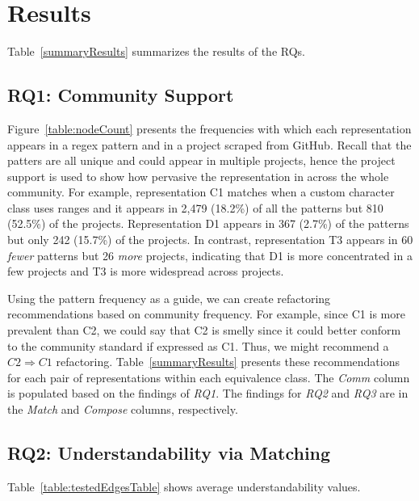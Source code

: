 \section{Results}
\label{sec:results}
Table~\ref{summaryResults} summarizes the results of the RQs.  



\subsection{RQ1: Community Support}
Figure~\ref{table:nodeCount} presents the frequencies with which each representation appears in a regex pattern and in a project scraped from GitHub. Recall that the patters are all unique and could appear in multiple projects, hence the project support is used to show how pervasive the representation in across the whole community. For example, representation C1 matches when a custom character class uses ranges and it appears in 2,479 (18.2\%) of all the patterns but 810 (52.5\%) of the projects. Representation D1 appears in 367 (2.7\%) of the patterns but only 242 (15.7\%) of the projects. In contrast, representation T3 appears in 60 \emph{fewer} patterns but 26 \emph{more} projects, indicating that D1 is more concentrated in a few projects and T3 is more widespread across projects. 

Using the pattern frequency as a guide, we can create refactoring recommendations based on community frequency. For example, since C1 is more prevalent than C2, we could say that C2 is smelly since it could better conform to the community standard if expressed as C1. Thus, we might recommend a $C2 \Rightarrow C1$ refactoring. Table~\ref{summaryResults} presents these recommendations for each pair of representations within each equivalence class. The \emph{Comm} column is populated based on the findings of \emph{RQ1}. The findings for \emph{RQ2} and \emph{RQ3} are in the \emph{Match} and \emph{Compose} columns, respectively. 




\subsection{RQ2: Understandability via Matching}
Table~\ref{table:testedEdgesTable} shows average understandability values. 

